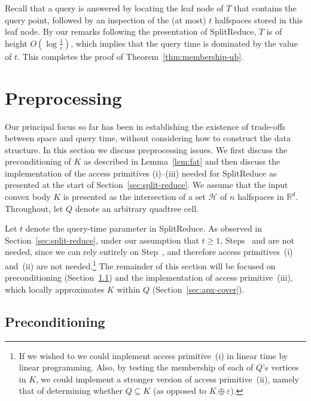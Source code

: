 \documentclass[11pt]{article}   \usepackage[letterpaper,hmargin=2.1cm,vmargin=3cm]{geometry}
\newcommand{\RE}{\mathbb{R}}    \newcommand{\ZZ}{\mathbb{Z}}    \newcommand{\eps}{\varepsilon}  \newcommand{\ST}{\,:\,}         \newcommand{\sq}{\square}
\newcommand{\inv}[1]{\frac{1}{#1}}
\newcommand{\alg}{\textrm{SplitReduce}}
\begin{document}
Recall that a query is answered by locating the leaf node of $T$ that contains the query point, followed by an inspection of the (at most) $t$ halfspaces stored in this leaf node. By our remarks following the presentation of {\alg}, $T$ is of height $O(\log \inv{\eps})$, which implies that the query time is dominated by the value of $t$. This completes the proof of Theorem~\ref{thm:membership-ub}.

\section{Preprocessing} \label{sec:preproc}


Our principal focus so far has been in establishing the existence of trade-offs between space and query time, without considering how to construct the data structure. In this section we discuss preprocessing issues. We first discuss the preconditioning of $K$ as described in Lemma~\ref{lem:fat} and then discuss the implementation of the access primitives (i)--(iii) needed for {\alg} as presented at the start of Section~\ref{sec:split-reduce}. We assume that the input convex body $K$ is presented as the intersection of a set $\mathcal{H}$ of $n$ halfspaces in $\RE^d$. Throughout, let $Q$ denote an arbitrary quadtree cell.

Let $t$ denote the query-time parameter in {\alg}. As observed in Section~\ref{sec:split-reduce}, under our assumption that $t \ge 1$, Steps~{\stepout} and {\stepin} are not needed, since we can rely entirely on Step~{\stepapx}, and therefore access primitives~(i) and~(ii) are not needed.\footnote{If we wished to we could implement access primitive~(i) in linear time by linear programming. Also, by testing the membership of each of $Q$'s vertices in $K$, we could implement a stronger version of access primitive~(ii), namely that of determining whether $Q \subseteq K$ (as opposed to $K \oplus \eps$).}
The remainder of this section will be focused on preconditioning (Section~\ref{sec:precondition}) and the implementation of access primitive~(iii), which locally approximates $K$ within $Q$ (Section~\ref{sec:apx-cover}).

\subsection{Preconditioning} \label{sec:precondition}
\end{document}
